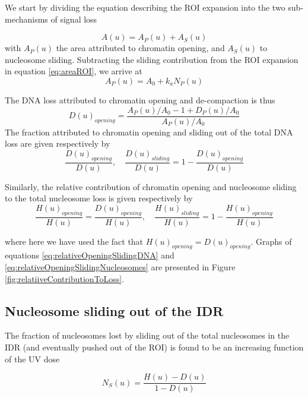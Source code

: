 \documentclass[12pt]{article}
\begin{document}
We start by dividing the equation describing the ROI expansion into the
two sub-mechanisms of signal loss

\begin{equation*}
A(u) = A_P(u) +A_S(u)
\end{equation*}
with $A_P(u)$ the area attributed to chromatin opening, and $A_S(u)$ to nucleosome sliding. Subtracting the sliding contribution from the ROI expansion
in equation \eqref{eq:areaROI}, we arrive at
\begin{equation*}
A_P(u) = A_0 + k_aN_P(u)
\end{equation*}

The DNA loss attributed to chromatin opening and de-compaction is thus
\begin{equation*}
D(u)_{opening}= \frac{A_P(u)/A_0 -1 +D_P(u)/A_0}{A_P(u)/A_0}
\end{equation*}	
The fraction attributed to chromatin opening and sliding out of the total
DNA loss are given respectively by
\begin{equation}\label{eq:relativeOpeningSlidingDNA}
\frac{D(u)_{opening}}{D(u)}, \quad \frac{D(u)_{sliding}}{D(u)}=1-\frac{D(u)_{opening}}{D(u)}
\end{equation}

Similarly, the relative contribution of chromatin opening and nucleosome
sliding to the total nucleosome loss is given respectively by
\begin{equation}\label{eq:relativeOpeningSlidingNucleosomes}
\frac{H(u)_{opening}}{H(u)} = \frac{D(u)_{opening}}{H(u)},\quad \frac{H(u)_{sliding}}{H(u)}=1-\frac{H(u)_{opening}}{H(u)}
\end{equation}

where here we have used the fact that $H(u)_{opening} = D(u)_{opening}$. Graphs of
equations \eqref{eq:relativeOpeningSlidingDNA} and \eqref{eq:relativeOpeningSlidingNucleosomes}  are presented in Figure \ref{fig:relatiiveContributionToLoss}.

\subsection{Nucleosome sliding out of the IDR}
The fraction of nucleosomes lost by sliding out of the total nucleosomes in the IDR
(and eventually pushed out of the ROI) is found to be an increasing function
of the UV dose

\begin{equation*}
N_S(u) = \frac{H(u)-D(u)}{1-D(u)}
\end{equation*}
\end{document}
